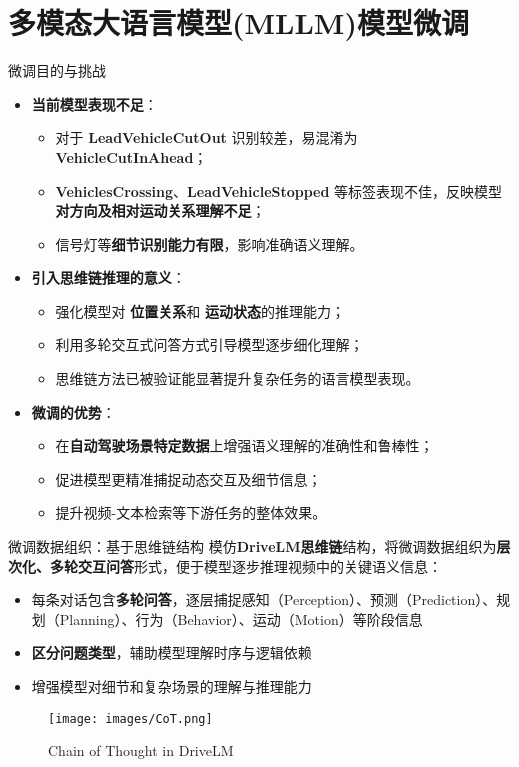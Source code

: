 \documentclass[serif]{beamer}
\begin{document}
\section{多模态大语言模型(MLLM)模型微调}
\begin{frame}{微调目的与挑战}
\begin{itemize}
  \item \textbf{当前模型表现不足}：
    \begin{itemize}
      \item 对于 \textbf{LeadVehicleCutOut} 识别较差，易混淆为 \textbf{VehicleCutInAhead}；
      \item \textbf{VehiclesCrossing}、\textbf{LeadVehicleStopped} 等标签表现不佳，反映模型\textbf{对方向及相对运动关系理解不足}；
      \item 信号灯等\textbf{细节识别能力有限}，影响准确语义理解。
    \end{itemize}

  \item \textbf{引入思维链推理的意义}：
    \begin{itemize}
      \item 强化模型对 \textbf{位置关系}和 \textbf{运动状态}的推理能力；
      \item 利用多轮交互式问答方式引导模型逐步细化理解；
      \item 思维链方法已被验证能显著提升复杂任务的语言模型表现。
    \end{itemize}

  \item \textbf{微调的优势}：
    \begin{itemize}
      \item 在\textbf{自动驾驶场景特定数据}上增强语义理解的准确性和鲁棒性；
      \item 促进模型更精准捕捉动态交互及细节信息；
      \item 提升视频-文本检索等下游任务的整体效果。
    \end{itemize}
\end{itemize}
\end{frame}


\begin{frame}[fragile]{微调数据组织：基于思维链结构}
模仿\textbf{DriveLM思维链}结构，将微调数据组织为\textbf{层次化、多轮交互问答}形式，便于模型逐步推理视频中的关键语义信息：

\begin{itemize}
  \item 每条对话包含\textbf{多轮问答}，逐层捕捉感知（Perception）、预测（Prediction）、规划（Planning）、行为（Behavior）、运动（Motion）等阶段信息
  \item \textbf{区分问题类型}，辅助模型理解时序与逻辑依赖
  \item 增强模型对细节和复杂场景的理解与推理能力
\end{itemize}

\vspace{-0.5em}
\begin{figure}
    \centering
    \texttt{[image: images/CoT.png]}
    \caption{Chain of Thought in DriveLM}
    \label{fig:Chain of Thought in DriveLM}
\end{figure}

\end{frame}
\end{document}
